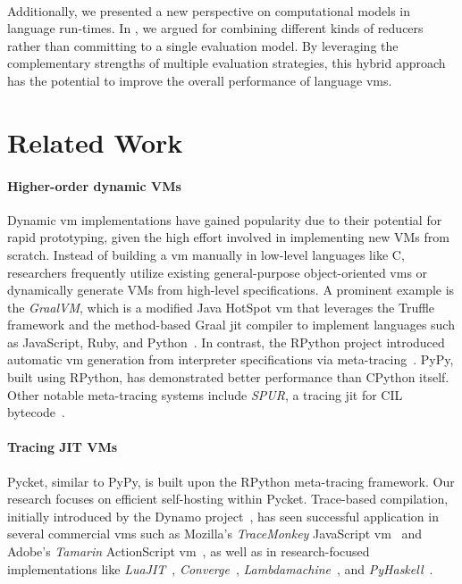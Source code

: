     \paragraph{}%
        Additionally, we presented a new perspective on computational models in language run-times. In , we argued for combining different kinds of reducers rather than committing to a single evaluation model. By leveraging the complementary strengths of multiple evaluation strategies, this hybrid approach has the potential to improve the overall performance of language \glspl{vm}.

    \section{Related Work}
        \label{section:related-work}

        \paragraph{Higher-order dynamic VMs}%
            Dynamic \gls{vm} implementations have gained popularity due to their potential for rapid prototyping, given the high effort involved in implementing new VMs from scratch. Instead of building a \gls{vm} manually in low-level languages like C, researchers frequently utilize existing general-purpose object-oriented \glspl{vm} or dynamically generate VMs from high-level specifications. A prominent example is the \emph{GraalVM}, which is a modified Java HotSpot \gls{vm} that leverages the Truffle framework and the method-based Graal \gls{jit} compiler to implement languages such as JavaScript, Ruby, and Python~\cite{truffle-graal}. In contrast, the RPython project introduced automatic \gls{vm} generation from interpreter specifications via meta-tracing~\cite{rpython07}. PyPy, built using RPython, has demonstrated better performance than CPython itself. Other notable meta-tracing systems include \emph{SPUR}, a tracing \gls{jit} for CIL bytecode~\cite{spurJIT,millerCommonLanguageInfrastructure2003}.

        \paragraph{Tracing JIT VMs}%
            Pycket, similar to PyPy, is built upon the RPython meta-tracing framework. Our research focuses on efficient self-hosting within Pycket. Trace-based compilation, initially introduced by the Dynamo project~\cite{dynamo}, has seen successful application in several commercial \glspl{vm} such as Mozilla's \emph{TraceMonkey} JavaScript \gls{vm}~\cite{traceMonkey} and Adobe's \emph{Tamarin} ActionScript \gls{vm}~\cite{tamarin}, as well as in research-focused implementations like \emph{LuaJIT}~\cite{LuaJITLanguageToolkit}, \emph{Converge}~\cite{converge:05}, \emph{Lambdamachine}~\cite{lambdamachine}, and \emph{PyHaskell}~\cite{pyhaskell}.

